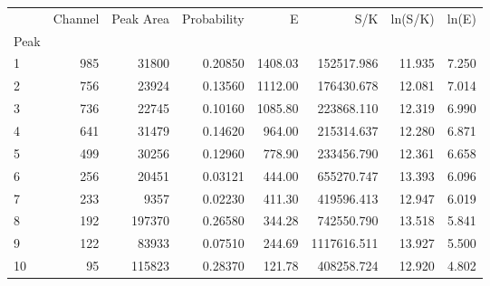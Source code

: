 \begin{tabular}{lrrrrrrr}
\toprule
{} &  Channel &  Peak Area &  Probability &        E &          S/K &  ln(S/K) &  ln(E) \\
Peak &          &            &              &          &              &          &        \\
\midrule
1    &      985 &      31800 &      0.20850 &  1408.03 &   152517.986 &   11.935 &  7.250 \\
2    &      756 &      23924 &      0.13560 &  1112.00 &   176430.678 &   12.081 &  7.014 \\
3    &      736 &      22745 &      0.10160 &  1085.80 &   223868.110 &   12.319 &  6.990 \\
4    &      641 &      31479 &      0.14620 &   964.00 &   215314.637 &   12.280 &  6.871 \\
5    &      499 &      30256 &      0.12960 &   778.90 &   233456.790 &   12.361 &  6.658 \\
6    &      256 &      20451 &      0.03121 &   444.00 &   655270.747 &   13.393 &  6.096 \\
7    &      233 &       9357 &      0.02230 &   411.30 &   419596.413 &   12.947 &  6.019 \\
8    &      192 &     197370 &      0.26580 &   344.28 &   742550.790 &   13.518 &  5.841 \\
9    &      122 &      83933 &      0.07510 &   244.69 &  1117616.511 &   13.927 &  5.500 \\
10   &       95 &     115823 &      0.28370 &   121.78 &   408258.724 &   12.920 &  4.802 \\
\bottomrule
\end{tabular}
